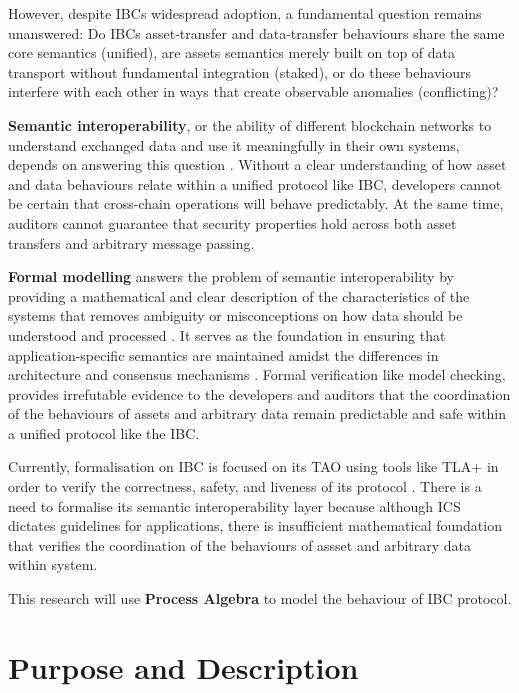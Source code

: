 However, despite IBC\textquotesingle s widespread adoption, a
fundamental question remains unanswered: Do IBC\textquotesingle s
asset-transfer and data-transfer behaviours share the same core
semantics (unified), are assets semantics merely built on top of data
transport without fundamental integration (staked), or do these
behaviours interfere with each other in ways that create observable
anomalies (conflicting)?

\textbf{Semantic interoperability}, or the ability of different
blockchain networks to understand exchanged data and use it meaningfully
in their own systems, depends on answering this question
\citep{Saleh2024} \citep{Belchior_2021}. Without a clear understanding
of how asset and data behaviours relate within a unified protocol like
IBC, developers cannot be certain that cross-chain operations will
behave predictably. At the same time, auditors cannot guarantee that
security properties hold across both asset transfers and arbitrary
message passing.

\textbf{Formal modelling} answers the problem of semantic
interoperability by providing a mathematical and clear description of
the characteristics of the systems that removes ambiguity or
misconceptions on how data should be understood and processed
\citep{verma2022formalmethods}. It serves as the foundation in ensuring
that application-specific semantics are maintained amidst the
differences in architecture and consensus mechanisms \citep{Saleh2024}
\citep{Belchior_2021}. Formal verification like model checking, provides
irrefutable evidence to the developers and auditors that the
coordination of the behaviours of assets and arbitrary data remain
predictable and safe within a unified protocol like the IBC.

Currently, formalisation on IBC is focused on its TAO using tools like
TLA+ in order to verify the correctness, safety, and liveness of its
protocol \citep{Wei_2023}. There is a need to formalise its semantic
interoperability layer because although ICS dictates guidelines for
applications, there is insufficient mathematical foundation that
verifies the coordination of the behaviours of assset and arbitrary data
within system.

This research will use \textbf{Process Algebra} to model the behaviour
of IBC protocol.

\section{Purpose and Description}\label{purpose-and-description}

